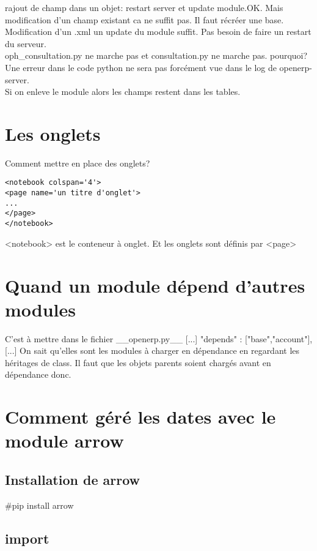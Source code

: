 \documentclass[12pt,a4paper]{article}
\begin{document}
rajout de champ dans un objet: restart server et update module.OK. Mais modification d'un champ existant ca ne suffit pas. Il faut récréer une base.\\
Modification d'un .xml un update du module suffit. Pas besoin de faire un restart du serveur.\\
oph\_consultation.py ne marche pas et consultation.py ne marche pas. pourquoi?\\Une erreur dans le code python ne sera pas forcément vue dans le log de openerp-server.\\
Si on enleve le module alors les champs restent dans les tables.\\

\section{Les onglets}
\label{sec:onglets}

Comment mettre en place des onglets?
\begin{verbatim}
<notebook colspan='4'>
<page name='un titre d'onglet'>
...
</page>
</notebook>
\end{verbatim}
<notebook> est le conteneur à onglet. Et les onglets sont définis par <page>

\section{Quand un module dépend d’autres modules}
\label{sec:depends}

C’est à mettre dans le fichier \_\_openerp.py\_\_ [...] "depends" : ["base","account"], [...]
On sait qu’elles sont les modules à charger en dépendance en regardant les héritages de class. Il faut que les objets parents soient chargés avant en dépendance donc.

\section{Comment géré les dates avec le module arrow}
\label{sec:arrow}

\subsection{Installation de arrow}
\label{sec:install}

\#pip install arrow

\subsection{import}
\label{sec:import}
\end{document}
